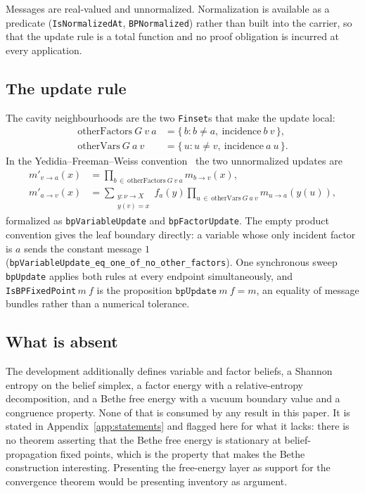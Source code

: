 \documentclass[aps,prx,reprint,nofootinbib,floatfix]{revtex4-2}
\begin{document}
Messages are real-valued and unnormalized. Normalization is available as a
predicate (\texttt{IsNormalizedAt}, \texttt{BPNormalized}) rather than built
into the carrier, so that the update rule is a total function and no proof
obligation is incurred at every application.

\subsection{The update rule}

The cavity neighbourhoods are the two \texttt{Finset}s that make the update
local:
\begin{align}
\mathrm{otherFactors}\ G\ v\ a &= \{\, b : b \neq a,\ \mathrm{incidence}\ b\ v \,\},\\
\mathrm{otherVars}\ G\ a\ v &= \{\, u : u \neq v,\ \mathrm{incidence}\ a\ u \,\}.
\end{align}
In the Yedidia--Freeman--Weiss convention~\cite{YedidiaFreemanWeiss2003} the
two unnormalized updates are
\begin{align}
\label{eq:varupdate}
m'_{v \to a}(x) &= \!\!\prod_{b \,\in\, \mathrm{otherFactors}\ G\ v\ a}\!\! m_{b \to v}(x),\\
\label{eq:facupdate}
m'_{a \to v}(x) &= \sum_{\substack{y : \nu \to X \\ y(v) = x}} f_a(y)
  \!\!\prod_{u \,\in\, \mathrm{otherVars}\ G\ a\ v}\!\! m_{u \to a}(y(u)),
\end{align}
formalized as \texttt{bpVariableUpdate} and \texttt{bpFactorUpdate}. The empty
product convention gives the leaf boundary directly: a variable whose only
incident factor is $a$ sends the constant message $1$
(\texttt{bpVariableUpdate\_eq\_one\_of\_no\_other\_factors}). One synchronous
sweep \texttt{bpUpdate} applies both rules at every endpoint simultaneously,
and \texttt{IsBPFixedPoint}\,$m\ f$ is the proposition
$\texttt{bpUpdate}\ m\ f = m$, an equality of message bundles rather than a
numerical tolerance.

\subsection{What is absent}

The development additionally defines variable and factor beliefs, a Shannon
entropy on the belief simplex, a factor energy with a relative-entropy
decomposition, and a Bethe free energy with a vacuum boundary value and a
congruence property. None of that is consumed by any result in this paper.
It is stated in Appendix~\ref{app:statements} and flagged here for what it
lacks: there is no theorem asserting that the Bethe free energy is stationary
at belief-propagation fixed points, which is the property that makes the Bethe
construction interesting. Presenting the free-energy layer as support for the
convergence theorem would be presenting inventory as argument.
\end{document}
